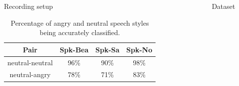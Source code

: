 \documentclass[final]{beamer}
\newlength{\sepwid}
\newlength{\onecolwid}
\newlength{\twocolwid}
\newcommand{\fatskip}{\vspace{3cm}}
\begin{document}
\begin{frame}[t]
\begin{columns}[t]
\begin{column}{\onecolwid}
\begin{block}{Recording setup}
\end{block}



\fatskip
 \begin{table}
 \center

 \label{tab:resultsEvalPerc}
 \begin{tabular}{|c|c|c|c|}
 \hline
 Pair & Spk-Bea & Spk-Sa & Spk-No \\
 \hline
 neutral-neutral & 96\% & 90\% & 98\%\\
 neutral-angry  & 78\% & 71\% & 83\%\\
 \hline
 \end{tabular}
  \caption{Percentage of angry and neutral speech styles being accurately classified.}
 \end{table}






\end{column} %

\begin{column}{\sepwid}\end{column} %



\begin{column}{\onecolwid} %

\fatskip
\begin{block}{Dataset}



\end{block}
\end{column}
\end{columns}
\end{frame}
\end{document}
